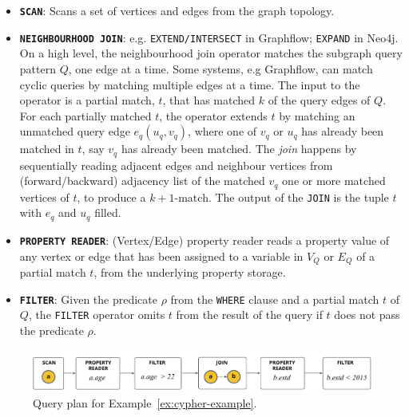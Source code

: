 \begin{itemize}
	
	\item \textbf{\texttt{SCAN}}: Scans a set of vertices and edges from the graph topology.
	
	\item \textbf{\texttt{NEIGHBOURHOOD JOIN}}: e.g. \texttt{EXTEND/INTERSECT} in Graphflow; \texttt{EXPAND} in Neo4j. On a high level, the neighbourhood join operator matches the subgraph query pattern $Q$, one edge at a time. Some systems, e.g Graphflow, can match cyclic queries by matching multiple edges at a time. The input to the operator is a partial match, $t$, that has matched $k$ of the query edges of $Q$. For each partially matched $t$, the operator extends $t$ by matching an unmatched query edge $e_q(u_q, v_q)$, where one of $v_q$ or $u_q$ has already been matched in $t$, say $v_q$ has already been matched. The \emph{join} happens by sequentially reading adjacent edges and neighbour vertices from (forward/backward) adjacency list of the matched $v_q$ one or more matched vertices of $t$, to produce a $k+1$-match. The output of the \texttt{JOIN} is the tuple $t$ with $e_q$ and $u_q$ filled.
	
	\item \textbf{\texttt{PROPERTY READER}}: (Vertex/Edge) property reader reads a property value of any vertex or edge that has been assigned to a variable in $V_Q$ or $E_Q$ of a partial match $t$, from the underlying property storage. 
	
	\item \textbf{\texttt{FILTER}}: Given the predicate $\rho$ from the \texttt{WHERE} clause and a partial match $t$ of $Q$, the \texttt{FILTER} operator omits $t$ from the result of the query if $t$ does not pass the predicate $\rho$.
	
\end{itemize}

\begin{figure}
	\hfill\includegraphics[scale=0.78]{img/ex-qp}\hfill
	\vspace{-10pt}
	\caption{Query plan for Example~\ref{ex:cypher-example}.}
	\vspace{-8pt}
	\label{fig:ex-qp}
\end{figure}

